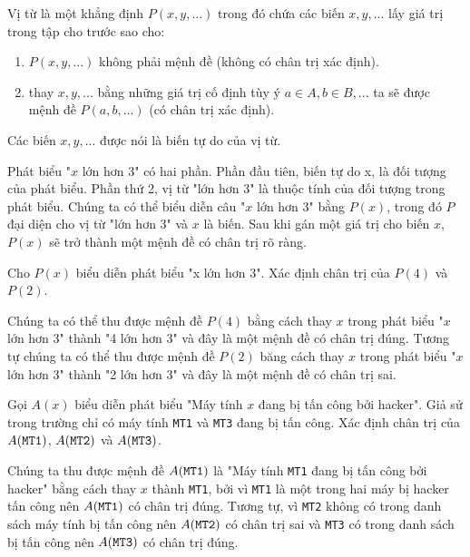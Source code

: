 \documentclass{standalone} %
\begin{document}
        \begin{definition}
            Vị từ là một khẳng định $P(x, y, ...)$ trong đó chứa các biến $x, y, ...$ lấy giá trị trong tập cho trước sao cho:
            \begin{enumerate}
                \item $P(x, y, ...)$ không phải mệnh đề (không có chân trị xác định).
                \item thay $x, y, ...$ bằng những giá trị cố định tùy ý $a \in A, b \in B, ...$ ta sẽ được mệnh đề $P(a, b, ...)$ (có chân trị xác định).
            \end{enumerate}
            Các biến $x, y, ...$ được nói là biến tự do của vị từ.
        \end{definition}
        
        Phát biểu "$x$ lớn hơn 3" có hai phần. Phần đầu tiên, biến tự do x, là đối tượng của phát biểu. Phần thứ 2, vị từ "lớn hơn 3" là thuộc tính của đối tượng trong phát biểu. Chúng ta có thể biểu diễn câu "$x$ lớn hơn 3" bằng $P(x)$, trong đó $P$ đại diện cho vị từ "lớn hơn 3" và $x$ là biến. Sau khi gán một giá trị cho biến $x$, $P(x)$ sẽ trở thành một mệnh đề có chân trị rõ ràng. 
        
        \begin{example}
            Cho $P(x)$ biểu diễn phát biểu "x lớn hơn 3". Xác định chân trị của $P(4)$ và $P(2)$.
        \end{example}
        
        Chúng ta có thể thu được mệnh đề $P(4)$ bằng cách thay $x$ trong phát biểu "$x$ lớn hơn 3" thành "4 lớn hơn 3" và đây là một mệnh đề có chân trị đúng. Tương tự chúng ta có thể thu được mệnh đề $P(2)$ băng cách thay $x$ trong phát biểu "$x$ lớn hơn 3" thành "2 lớn hơn 3" và đây là một mệnh đề có chân trị sai. 
        
        \begin{example}
            Gọi $A(x)$ biểu diễn phát biểu "Máy tính $x$ đang bị tấn công bởi hacker". Giả sử trong trường chỉ có máy tính \texttt{MT1} và \texttt{MT3} đang bị tấn công. Xác định chân trị của $A(\text{\texttt{MT1}})$, $A(\text{\texttt{MT2}})$ và $A(\text{\texttt{MT3}})$.
        \end{example}
        
        Chúng ta thu được mệnh đề $A(\text{\texttt{MT1}})$ là "Máy tính \texttt{MT1} đang bị tấn công bởi hacker" bằng cách thay $x$ thành \texttt{MT1}, bởi vì \texttt{MT1} là một trong hai máy bị hacker tấn công nên $A(\text{\texttt{MT1}})$ có chân trị đúng. Tương tự, vì \texttt{MT2} không có trong danh sách máy tính bị tấn công nên $A(\text{\texttt{MT2}})$ có chân trị sai và \texttt{MT3} có trong danh sách bị tấn công nên $A(\text{\texttt{MT3}})$ có chân trị đúng.
        
\end{document}
